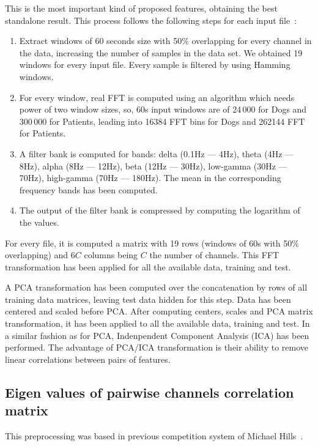 \documentclass[a4paper,english,twoside]{article}
\begin{document}
This is the most important kind of proposed features, obtaining the best
standalone result. This process follows the following steps for each input
file~\cite{2014:howbert:plosone}:

\begin{enumerate}
\item
  Extract windows of 60 seconds size with 50\% overlapping for every
  channel in the data, increasing the number of samples in the data set.
  We obtained 19 windows for every input file. Every sample is filtered
  by using Hamming windows.
\item
  For every window, real FFT is computed using an algorithm which needs
  power of two window sizes, so, 60s input windows are of 24\,000 for Dogs
  and 300\,000 for Patients, leading into 16384 FFT bins for Dogs and
  262144 FFT for Patients.
\item A filter bank is computed for bands: delta (0.1Hz --- 4Hz), theta (4Hz ---
  8Hz), alpha (8Hz --- 12Hz), beta (12Hz --- 30Hz), low-gamma (30Hz --- 70Hz),
  high-gamma (70Hz --- 180Hz). The mean in the corresponding frequency bands has
  been computed.
\item
  The output of the filter bank is compressed by computing the logarithm
  of the values.
\end{enumerate}

For every file, it is computed a matrix with 19 rows (windows of 60s with 50\%
overlapping) and $6C$ columns being $C$ the number of channels. This FFT
transformation has been applied for all the available data, training and test.

A PCA transformation has been computed over the concatenation by rows of
all training data matrices, leaving test data hidden for this step. Data
has been centered and scaled before PCA. After computing centers, scales
and PCA matrix transformation, it has been applied to all the available
data, training and test. In a similar fashion as for PCA, Indenpendent
Component Analysis (ICA) has been performed. The advantage of PCA/ICA
transformation is their ability to remove linear correlations between
pairs of features.

\subsection{Eigen values of pairwise channels correlation
  matrix}\label{eigen-values-of-pairwise-channels-correlation-matrix}

This preprocessing was based in previous competition system of Michael Hills~\cite{michaelhills}.
\end{document}
